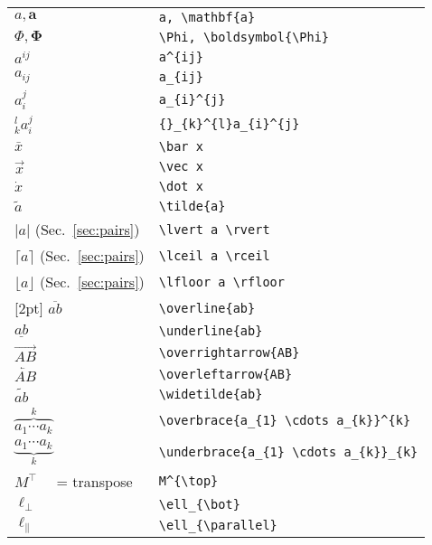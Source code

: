 \documentclass[a4paper,10pt,landscape]{article}
\theoremstyle{definition}
\theoremstyle{remark}
\newcommand{\refsec}[1]{Sec.~\ref{#1}}
\begin{document}
\begin{multicols}{3}
\begin{tabular}{@{}ll@{}}
	$a, \mathbf{a}$	&\verb!a, \mathbf{a}!\\
	$\Phi, \boldsymbol{\Phi}$	&\verb!\Phi, \boldsymbol{\Phi}!\\
	$a^{ij}$	&\verb!a^{ij}!\\
	$a_{ij}$	&\verb!a_{ij}!\\
	$a_{i}^{j}$	&\verb!a_{i}^{j}!\\
	${}_{k}^{l}a_{i}^{j}$	&\verb!{}_{k}^{l}a_{i}^{j}!\\
	$\bar x$	&\verb!\bar x!\\
	$\vec x$	&\verb!\vec x!\\
	$\dot x$	&\verb!\dot x!\\
	$\tilde{a}$	&\verb!\tilde{a}!\\
	$\lvert a \rvert$ (\refsec{sec:pairs})	&\verb!\lvert a \rvert!\\
	$\lceil a \rceil$ (\refsec{sec:pairs})	&\verb!\lceil a \rceil!\\
	$\lfloor a \rfloor$ (\refsec{sec:pairs})	&\verb!\lfloor a \rfloor!\\
	[2pt]
	$\overline{ab}$	&\verb!\overline{ab}!\\
	$\underline{ab}$	&\verb!\underline{ab}!\\
	[2pt]
	$\overrightarrow{AB}$	&\verb!\overrightarrow{AB}!\\
	[2pt]
	$\overleftarrow{AB}$	&\verb!\overleftarrow{AB}!\\
	[2pt]
	$\widetilde{ab}$	&\verb!\widetilde{ab}!\\
	[2pt]
	$\overbrace{a_{1} \cdots a_{k}}^{k}$	&\verb!\overbrace{a_{1} \cdots a_{k}}^{k}!\\
	[2pt]
	$\underbrace{a_{1} \cdots a_{k}}_{k}$	&\verb!\underbrace{a_{1} \cdots a_{k}}_{k}!\\
	[2pt]
	$M^{\top}$	~~= transpose	&\verb!M^{\top}!\\
	$\ell_{\bot}$	&\verb!\ell_{\bot}!\\
	$\ell_{\parallel}$	&\verb!\ell_{\parallel}!\\
\end{tabular}





\end{multicols}
\end{document}
